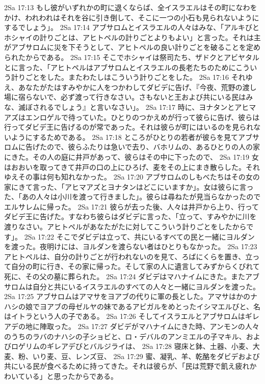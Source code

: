 2Sa 17:13  もし彼がいずれかの町に退くならば、全イスラエルはその町になわをかけ、われわれはそれを谷に引き倒して、そこに一つの小石も見られないようにするでしょう」。
2Sa 17:14  アブサロムとイスラエルの人々はみな、「アルキびとホシャイの計りごとは、アヒトペルの計りごとよりもよい」と言った。それは主がアブサロムに災を下そうとして、アヒトペルの良い計りごとを破ることを定められたからである。
2Sa 17:15  そこでホシャイは祭司たち、ザドクとアビヤタルとに言った、「アヒトペルはアブサロムとイスラエルの長老たちのためにこういう計りごとをした。またわたしはこういう計りごとをした。
2Sa 17:16  それゆえ、あなたがたはすみやかに人をつかわしてダビデに告げ、『今夜、荒野の渡し場に宿らないで、必ず渡って行きなさい。さもないと王および共にいる民はみな、滅ぼされるでしょう』と言いなさい」。
2Sa 17:17  時に、ヨナタンとアヒマアズはエンロゲルで待っていた。ひとりのつかえめが行って彼らに告げ、彼らは行ってダビデ王に告げるのが常であった。それは彼らが町にはいるのを見られないようにするためである。
2Sa 17:18  ところがひとりの若者が彼らを見てアブサロムに告げたので、彼らふたりは急いで去り、バホリムの、あるひとりの人の家にきた。その人の庭に井戸があって、彼らはその中に下ったので、
2Sa 17:19  女はおおいを取ってきて井戸の口の上にひろげ、麦をその上にまき散らした。それゆえその事は何も知れなかった。
2Sa 17:20  アブサロムのしもべたちはその女の家にきて言った、「アヒマアズとヨナタンはどこにいますか」。女は彼らに言った、「あの人々は小川を渡って行きました」。彼らは尋ねたが見当らなかったのでエルサレムに帰った。
2Sa 17:21  彼らが去った後、人々は井戸から上り、行ってダビデ王に告げた。すなわち彼らはダビデに言った、「立って、すみやかに川を渡りなさい。アヒトペルがあなたがたに対してこういう計りごとをしたからです」。
2Sa 17:22  そこでダビデは立って、共にいるすべての民と一緒にヨルダンを渡った。夜明けには、ヨルダンを渡らない者はひとりもなかった。
2Sa 17:23  アヒトペルは、自分の計りごとが行われないのを見て、ろばにくらを置き、立って自分の町に行き、その家に帰った。そして家の人に遺言してみずからくびれて死に、その父の墓に葬られた。
2Sa 17:24  ダビデはマハナイムにきた。またアブサロムは自分と共にいるイスラエルのすべての人々と一緒にヨルダンを渡った。
2Sa 17:25  アブサロムはアマサをヨアブの代りに軍の長とした。アマサはかのナハシの娘でヨアブの母ゼルヤの妹であるアビガルをめとったイシマエルびと、名はイトラという人の子である。
2Sa 17:26  そしてイスラエルとアブサロムはギレアデの地に陣取った。
2Sa 17:27  ダビデがマハナイムにきた時、アンモンの人々のうちのラバのナハシの子ショビと、ロ・デバルのアンミエルの子マキル、およびロゲリムのギレアデびとバルジライは、
2Sa 17:28  寝床と鉢、土器、小麦、大麦、粉、いり麦、豆、レンズ豆、
2Sa 17:29  蜜、凝乳、羊、乾酪をダビデおよび共にいる民が食べるために持ってきた。それは彼らが、「民は荒野で飢え疲れかわいている」と思ったからである。
